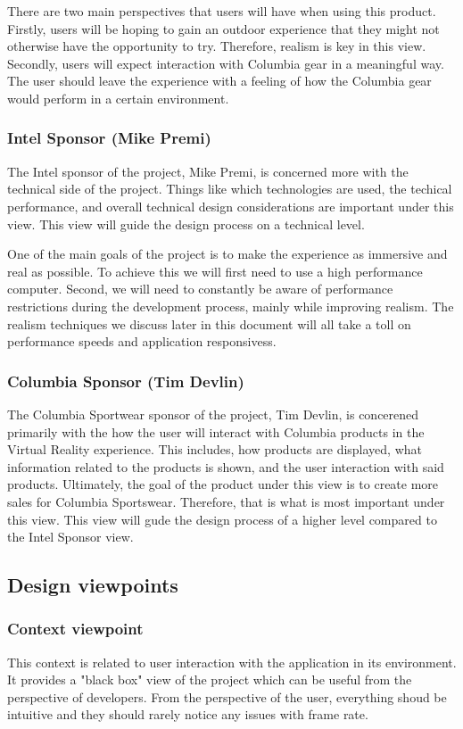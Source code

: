 \documentclass[10pt,journal,compsoc,onecolumn, draftclsnofoot]{IEEEtran}
\begin{document}
There are two main perspectives that users will have when using this product.
Firstly, users will be hoping to gain an outdoor experience that they might not otherwise have the opportunity to try. Therefore, realism is key in this view.
Secondly, users will expect interaction with Columbia gear in a meaningful way.
The user should leave the experience with a feeling of how the Columbia gear would perform in a certain environment.


\subsubsection{Intel Sponsor (Mike Premi)}
The Intel sponsor of the project, Mike Premi, is concerned more with the technical side of the project.
Things like which technologies are used, the techical performance, and overall technical design considerations are important under this view.
This view will guide the design process on a technical level.

One of the main goals of the project is to make the experience as immersive and real as possible. To achieve this we will first need to use a high performance computer. Second, we will need to constantly be aware of performance restrictions during the development process, mainly while improving realism. The realism techniques we discuss later in this document will all take a toll on performance speeds and application responsivess.

\subsubsection{Columbia Sponsor (Tim Devlin)}
The Columbia Sportwear sponsor of the project, Tim Devlin, is concerened primarily with the how the user will interact with Columbia products in the Virtual Reality experience.
This includes, how products are displayed, what information related to the products is shown, and the user interaction with said products.
Ultimately, the goal of the product under this view is to create more sales for Columbia Sportswear.
Therefore, that is what is most important under this view.
This view will gude the design process of a higher level compared to the Intel Sponsor view.

\subsection{Design viewpoints}
\subsubsection{Context viewpoint}
This context is related to user interaction with the application in its
environment. It provides a "black box" view of the project which can be useful
from the perspective of developers. From the perspective of the user, everything shoud be intuitive and they should rarely notice any issues with frame rate.\\
\end{document}
